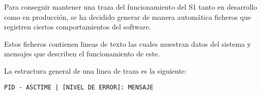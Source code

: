 Para conseguir mantener una traza del funcionamiento del \ac{S1} tanto en desarrollo como en producción, se ha decidido generar de manera automática ficheros que registren ciertos comportamientos del software. 

Estos ficheros contienen lineas de texto las cuales muestran datos del sistema y mensajes que describen el funcionamiento de este.

La estructura general de una linea de traza es la siguiente:
\begin{center}
    {\large \texttt{PID - ASCTIME | [NIVEL DE ERROR]: MENSAJE}}
\end{center}


